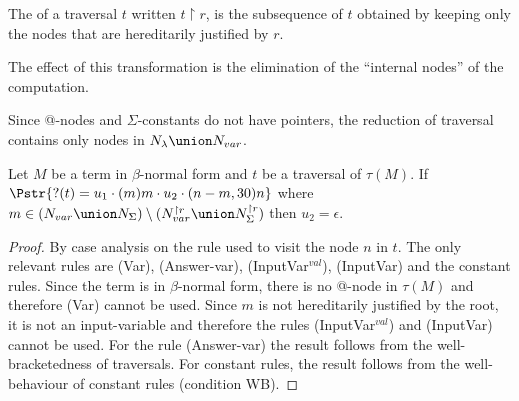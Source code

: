 

\begin{definition}
The  of a traversal $t$ written $ t
\upharpoonright r$, is the subsequence of $t$ obtained by keeping
only the nodes that are hereditarily justified by $r$.
\end{definition}
The effect of this transformation is the elimination of the
``internal nodes'' of the computation.

Since @-nodes and $\Sigma$-constants do not have pointers, the
reduction of traversal contains only nodes in $N_\lambda \union
N_{var}$.


\begin{lemma}
\label{lem:var_followedby_child} Let $M$ be a term in $\beta$-normal
form and $t$ be a traversal of $\tau(M)$. If
$\Pstr{ ?(t) = u_1 \cdot (m){m} \cdot u_2 \cdot (n-m,30){n} }$
 where $m \in (N_{var} \union N_{\Sigma}) \setminus (N^{\upharpoonright r}_{var} \union N^{\upharpoonright r}_{\Sigma})$
then $u_2 = \epsilon$.
\end{lemma}
\begin{proof}
By case analysis on the rule used to visit the node
$n$ in $t$. The only relevant rules are (Var), (Answer-var), (InputVar$^{val}$), (InputVar)
and the constant rules.
Since the term is in $\beta$-normal form, there is no @-node in $\tau(M)$ and therefore (Var) cannot be used.
Since $m$ is not hereditarily justified by the root, it is not an input-variable and therefore the rules
(InputVar$^{val}$) and (InputVar) cannot be used.
For the rule (Answer-var) the result follows from the well-bracketedness of traversals.
For constant rules, the result follows from the well-behaviour of constant rules (condition WB).
\end{proof}

